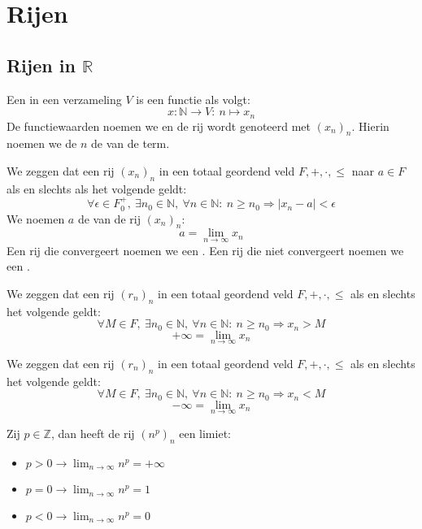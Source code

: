 \documentclass[main.tex]{subfiles}
\begin{document}
\chapter{Rijen}
\label{cha:rijen}

\section{Rijen in $\mathbb{R}$}
\label{sec:rijen-mathbbr}

\begin{de}
  Een  in een verzameling $V$ is een functie als volgt:
  \[ x: \mathbb{N} \rightarrow V:\ n\mapsto x_{n} \]
  De functiewaarden noemen we  en de rij wordt genoteerd met $(x_{n})_{n}$.
  Hierin noemen we de $n$ de  van de term.
\end{de}

\begin{de}
  We zeggen dat een rij $(x_{n})_{n}$ in een totaal geordend veld $F,+,\cdot,\le$  naar $a\in F$ als en slechts als het volgende geldt:
  \[ \forall \epsilon \in F_{0}^{+},\ \exists n_{0}\in \mathbb{N},\ \forall n\in \mathbb{N}:\ n \ge n_{0} \Rightarrow |x_{n}-a| < \epsilon \]
  We noemen $a$ de  van de rij $(x_{n})_{n}$:
  \[ a = \lim_{n\rightarrow \infty}x_{n} \]
  Een rij die convergeert noemen we een .
  Een rij die niet convergeert noemen we een .
\end{de}

\begin{de}
  We zeggen dat een rij $(r_{n})_{n}$ in een totaal geordend veld $F,+,\cdot,\le$  als en slechts het volgende geldt:
  \[ \forall M\in F,\ \exists n_{0}\in \mathbb{N},\ \forall n\in \mathbb{N}:\ n \ge n_{0} \Rightarrow x_{n} > M \]
  \[ + \infty = \lim_{n\rightarrow \infty}x_{n}\]
\end{de}

\begin{de}
  We zeggen dat een rij $(r_{n})_{n}$ in een totaal geordend veld $F,+,\cdot,\le$  als en slechts het volgende geldt:
  \[ \forall M\in F,\ \exists n_{0}\in \mathbb{N},\ \forall n\in \mathbb{N}:\ n \ge n_{0} \Rightarrow x_{n} < M \]
  \[ - \infty = \lim_{n\rightarrow \infty}x_{n}\]
\end{de}


\begin{pr}
  Zij $p\in \mathbb{Z}$, dan heeft de rij $(n^{p})_{n}$ een limiet:
  \begin{itemize}
  \item $p>0 \rightarrow \lim_{n\rightarrow \infty}n^{p} = + \infty$
  \item $p=0 \rightarrow \lim_{n\rightarrow \infty}n^{p} = 1$
  \item $p<0 \rightarrow \lim_{n\rightarrow \infty}n^{p} = 0$
  \end{itemize}
\end{pr}
\end{document}
